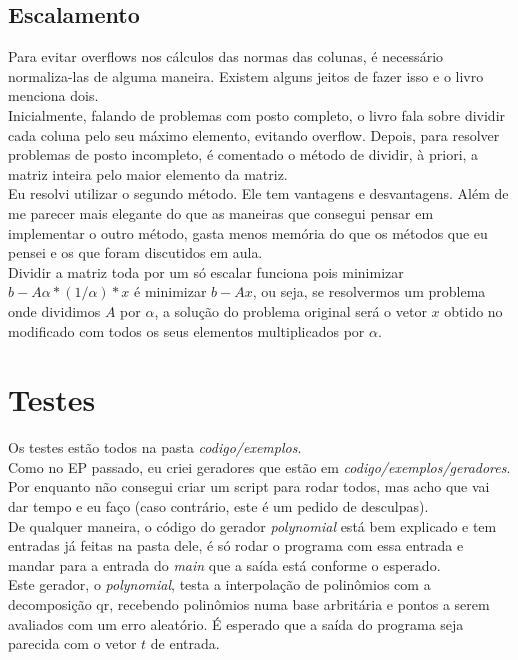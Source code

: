 \documentclass[
10pt, %
a4paper, %
oneside, %
headinclude,footinclude, %
BCOR5mm, %
]{scrartcl}
\begin{document}
\subsection{Escalamento}
Para evitar overflows nos cálculos das normas das colunas, é necessário normaliza-las de alguma maneira. Existem alguns jeitos de fazer isso e o livro menciona dois. \\
Inicialmente, falando de problemas com posto completo, o livro fala sobre dividir cada coluna pelo seu máximo elemento, evitando overflow. Depois, para resolver problemas de posto incompleto, é comentado o método de dividir, à priori, a matriz inteira pelo maior elemento da matriz. \\
Eu resolvi utilizar o segundo método. Ele tem vantagens e desvantagens. Além de me parecer mais elegante do que as maneiras que consegui pensar em implementar o outro método, gasta menos memória do que os métodos que eu pensei e os que foram discutidos em aula. \\
Dividir a matriz toda por um só escalar funciona pois minimizar $b-A\alpha * (1/\alpha) * x$ é minimizar $b-Ax$, ou seja, se resolvermos um problema onde dividimos $A$ por $\alpha$, a solução do problema original será o vetor $x$ obtido no modificado com todos os seus elementos multiplicados por $\alpha$.

\section{Testes}
Os testes estão todos na pasta \textit{codigo/exemplos}. \\
Como no EP passado, eu criei geradores que estão em \textit{codigo/exemplos/geradores}. Por enquanto não consegui criar um script para rodar todos, mas acho que vai dar tempo e eu faço (caso contrário, este é um pedido de desculpas). \\
De qualquer maneira, o código do gerador \textit{polynomial} está bem explicado e tem entradas já feitas na pasta dele, é só rodar o programa com essa entrada e mandar para a entrada do \textit{main} que a saída está conforme o esperado. \\
Este gerador, o \textit{polynomial}, testa a interpolação de polinômios com a decomposição qr, recebendo polinômios numa base arbritária e pontos a serem avaliados com um erro aleatório. É esperado que a saída do programa seja parecida com o vetor $t$ de entrada.


\end{document}
